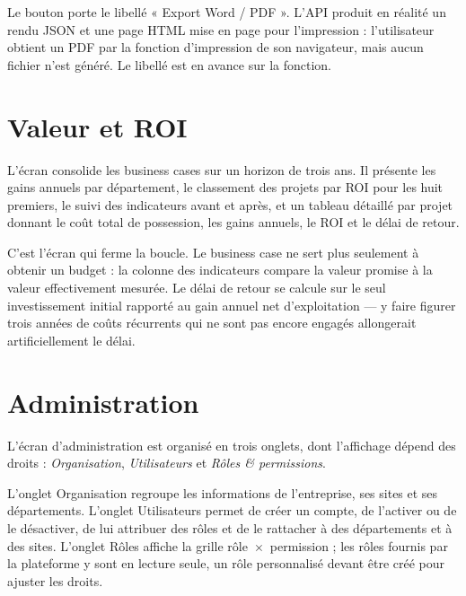 \begin{ecart}
Le bouton porte le libellé « Export Word / PDF ». L'API produit en réalité un rendu JSON
et une page HTML mise en page pour l'impression : l'utilisateur obtient un PDF par la
fonction d'impression de son navigateur, mais aucun fichier  n'est généré.
Le libellé est en avance sur la fonction.
\end{ecart}

\section{Valeur et ROI}

L'écran consolide les business cases sur un horizon de trois ans. Il présente les gains
annuels par département, le classement des projets par ROI pour les huit premiers, le
suivi des indicateurs avant et après, et un tableau détaillé par projet donnant le coût
total de possession, les gains annuels, le ROI et le délai de retour.


\begin{oral}
C'est l'écran qui ferme la boucle. Le business case ne sert plus seulement à obtenir un
budget : la colonne des indicateurs compare la valeur promise à la valeur effectivement
mesurée. Le délai de retour se calcule sur le seul investissement initial rapporté au
gain annuel net d'exploitation — y faire figurer trois années de coûts récurrents qui ne
sont pas encore engagés allongerait artificiellement le délai.
\end{oral}

\section{Administration}

L'écran d'administration est organisé en trois onglets, dont l'affichage dépend des
droits : \emph{Organisation}, \emph{Utilisateurs} et \emph{Rôles \& permissions}.

L'onglet Organisation regroupe les informations de l'entreprise, ses sites et ses
départements. L'onglet Utilisateurs permet de créer un compte, de l'activer ou de le
désactiver, de lui attribuer des rôles et de le rattacher à des départements et à des
sites. L'onglet Rôles affiche la grille rôle~$\times$~permission ; les rôles fournis par
la plateforme y sont en lecture seule, un rôle personnalisé devant être créé pour
ajuster les droits.

